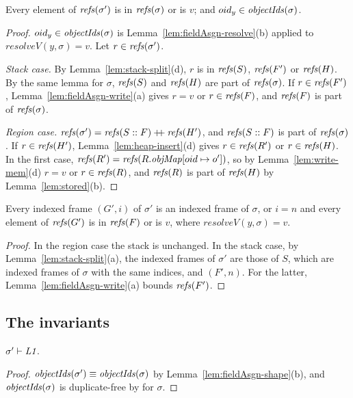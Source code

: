 \begin{lemma}
\label{lem:fieldAsgn-refs}
Every element of $\mathit{refs}(\sigma')$ is in $\mathit{refs}(\sigma)$ or is $v$; and $oid_y \in \mathit{objectIds}(\sigma)$.
\end{lemma}
\begin{proof}
$oid_y \in \mathit{objectIds}(\sigma)$ is Lemma~\ref{lem:fieldAsgn-resolve}(b) applied to
$\mathit{resolveV}(y, \sigma) = v$. Let $r \in \mathit{refs}(\sigma')$.

\emph{Stack case.} By Lemma~\ref{lem:stack-split}(d), $r$ is in $\mathit{refs}(S)$, $\mathit{refs}(F')$ or
$\mathit{refs}(H)$. By the same lemma for $\sigma$, $\mathit{refs}(S)$ and $\mathit{refs}(H)$ are part of $\mathit{refs}(\sigma)$. If
$r \in \mathit{refs}(F')$, Lemma~\ref{lem:fieldAsgn-write}(a) gives $r = v$ or $r \in \mathit{refs}(F)$, and $\mathit{refs}(F)$
is part of $\mathit{refs}(\sigma)$.

\emph{Region case.} $\mathit{refs}(\sigma') = \mathit{refs}(S :: F) \mathbin{+\!\!+} \mathit{refs}(H')$, and $\mathit{refs}(S :: F)$ is part of
$\mathit{refs}(\sigma)$. If $r \in \mathit{refs}(H')$, Lemma~\ref{lem:heap-insert}(d) gives $r \in \mathit{refs}(R')$ or
$r \in \mathit{refs}(H)$. In the first case, $\mathit{refs}(R') = \mathit{refs}(R.\mathit{objMap}[oid \mapsto o'])$, so by
Lemma~\ref{lem:write-mem}(d) $r = v$ or $r \in \mathit{refs}(R)$, and $\mathit{refs}(R)$ is part of $\mathit{refs}(H)$ by
Lemma~\ref{lem:stored}(b).
\end{proof}

\begin{lemma}
\label{lem:fieldAsgn-frames}
Every indexed frame $(G', i)$ of $\sigma'$ is an indexed frame of $\sigma$, or $i = n$ and every
element of $\mathit{refs}(G')$ is in $\mathit{refs}(F)$ or is $v$, where $\mathit{resolveV}(y, \sigma) = v$.
\end{lemma}
\begin{proof}
In the region case the stack is unchanged. In the stack case, by Lemma~\ref{lem:stack-split}(a), the
indexed frames of $\sigma'$ are those of $S$, which are indexed frames of $\sigma$ with the same
indices, and $(F', n)$. For the latter, Lemma~\ref{lem:fieldAsgn-write}(a) bounds $\mathit{refs}(F')$.
\end{proof}

\subsection{The invariants}

\begin{lemma}[\inv{L1}] 
$\sigma' \vdash \textit{L1}$.
\end{lemma}
\begin{proof}
$\mathit{objectIds}(\sigma') \equiv \mathit{objectIds}(\sigma)$ by Lemma~\ref{lem:fieldAsgn-shape}(b), and $\mathit{objectIds}(\sigma)$ is
duplicate-free by  for $\sigma$.
\end{proof}

